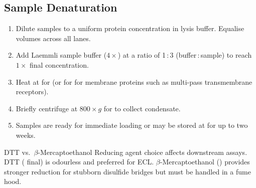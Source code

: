 \medskip

\begin{center}
\end{center}

\subsection{Sample Denaturation}

\begin{enumerate}
  \item Dilute samples to a uniform protein concentration in lysis buffer.
        Equalise volumes across all lanes.
  \item Add Laemmli sample buffer ($4\times$) at a ratio of 1\,:\,3
        (buffer\,:\,sample) to reach $1\times$ final concentration.
  \item Heat at  for  (or  for 
        for membrane proteins such as multi-pass transmembrane receptors).
  \item Briefly centrifuge at $800 \times g$ for  to collect condensate.
  \item Samples are ready for immediate loading or may be stored at 
        for up to two weeks.
\end{enumerate}

\par
\begin{notebox}{DTT vs.\ \ensuremath{\beta}-Mercaptoethanol}
Reducing agent choice affects downstream assays. DTT ( final) is
odourless and preferred for ECL. \ensuremath{\beta}-Mercaptoethanol () provides
stronger reduction for stubborn disulfide bridges but must be handled in a fume hood.
\end{notebox}

